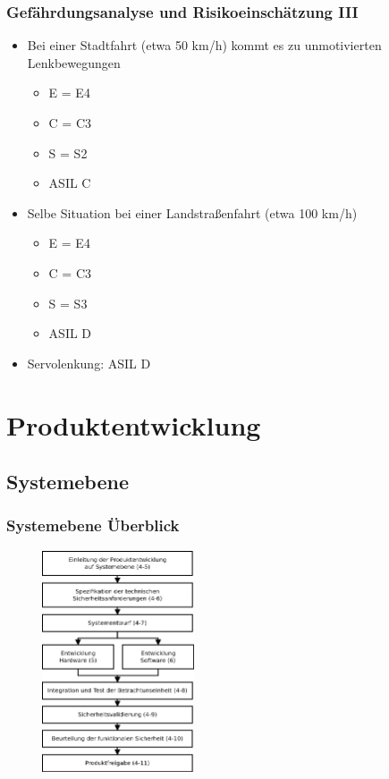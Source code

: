 \documentclass[]{beamer}
\begin{document}
\begin{frame}
\frametitle{Gefährdungsanalyse und Risikoeinschätzung III}

\begin{example}
    \begin{itemize}
    \item Bei einer Stadtfahrt (etwa 50 km/h) kommt es zu unmotivierten Lenkbewegungen
        \begin{itemize}
            \item E = E4
            \item C = C3
            \item S = S2
            \item ASIL C
        \end{itemize}
    \item Selbe Situation bei einer Landstraßenfahrt (etwa 100 km/h)
        \begin{itemize}
            \item E = E4
            \item C = C3
            \item S = S3
            \item ASIL D
        \end{itemize}
    \item Servolenkung: ASIL D
    \end{itemize}
\end{example}


\end{frame}


\section{Produktentwicklung}
\label{sec:Produktentwicklung}

\subsection{Systemebene}
\begin{frame}
\frametitle{Systemebene Überblick}

\begin{figure}
   \includegraphics[width=4.5cm]{Abb_6_3}
\end{figure}

\end{frame}
\end{document}
